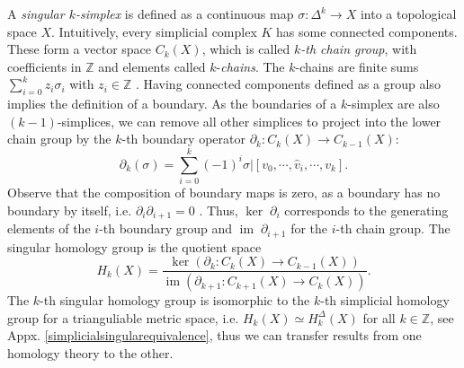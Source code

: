 \documentclass[envcountsect,runningheads]{llncs}
\DeclareMathOperator{\Ima}{im}
\begin{document}
A \textit{singular $k$-simplex} is defined as a continuous map $\sigma: \Delta^k \rightarrow X$ into a topological space $X$. Intuitively, every simplicial complex $K$ has some connected components. These form a vector space $C_k(X)$, which is called \textit{$k$-th chain group}, with coefficients in $\mathbb{Z}$ and elements called $k$-\textit{chains}. The $k$-chains are finite sums $\sum_{i=0}^{k} z_i \sigma_i$ with $z_i \in \mathbb{Z}$ . Having connected components defined as a group also implies the definition of a boundary. As the boundaries of a $k$-simplex are also $(k-1)$-simplices, we can remove all other simplices to project into the lower chain group by the $k$-th boundary operator $\partial_k: C_k(X) \rightarrow C_{k-1}(X)$:
\begin{equation}
    \partial_k(\sigma) = \sum_{i=0}^{k} (-1)^{i} \sigma \bigg\vert {[v_0,\cdots,\hat{v}_i, \cdots, v_k]}.
\end{equation}
Observe that the composition of boundary maps is zero, as a boundary has no boundary by itself, i.e. $\partial_i\partial_{i+1} = 0$ . Thus, $\ker \; \partial_i$ corresponds to the generating elements of the $i$-th boundary group and $\Ima \; \partial_{i+1}$ for the $i$-th chain group. The singular homology group is the quotient space
\begin{equation}
    H_k(X) = \frac{\ker \left(\partial_k: C_k\left(X\right) \rightarrow C_{k-1}\left(X\right)\right)}{\Ima \left(\partial_{k+1}:C_{k+1}\left(X\right) \rightarrow C_{k}\left(X\right)\right)}.
\end{equation}
The $k$-th singular homology group is isomorphic to the $k$-th simplicial homology group for a trianguliable metric space, i.e. $H_k(X) \simeq H^{\Delta}_k(X)$ for all $k \in \mathbb{Z}$, see Appx. \ref{simplicialsingularequivalence}, thus we can transfer results from one homology theory to the other.
\end{document}

